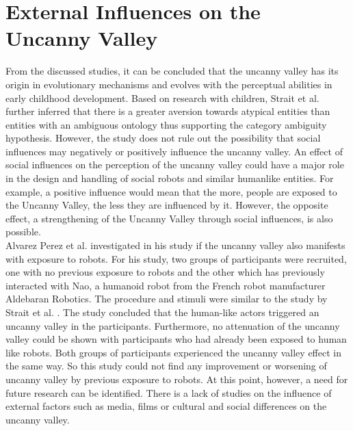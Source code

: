 \section{External Influences on the Uncanny Valley}
From the discussed studies, it can be concluded that the uncanny valley has its origin in evolutionary mechanisms and evolves with the perceptual abilities in early childhood development. Based on research with children, Strait et al. \cite{childrens_responding} further inferred that there is a greater aversion towards atypical entities than entities with an ambiguous ontology thus supporting the category ambiguity hypothesis. However, the study does not rule out the possibility that social influences may negatively or positively influence the uncanny valley. An effect of social influences on the perception of the uncanny valley could have a major role in the design and handling of social robots and similar humanlike entities. For example, a positive influence would mean that the more, people are exposed to the Uncanny Valley, the less they are influenced by it. However, the opposite effect, a strengthening of the Uncanny Valley through social influences, is also possible.\\
Alvarez Perez et al. \cite{prior_exposure_robots} investigated in his study if the uncanny valley also manifests with exposure to robots. For his study, two groups of participants were recruited, one with no previous exposure to robots and the other which has previously interacted with Nao, a humanoid robot from the French robot manufacturer Aldebaran Robotics. The procedure and stimuli were similar to the study by Strait et al. \cite{childrens_responding}. The study concluded that the human-like actors triggered an uncanny valley in the participants. Furthermore, no attenuation of the uncanny valley could be shown with participants who had already been exposed to human like robots. Both groups of participants experienced the uncanny valley effect in the same way. So this study could not find any improvement or worsening of uncanny valley by previous exposure to robots. At this point, however, a need for future research can be identified. There is a lack of studies on the influence of external factors such as media, films or cultural and social differences on the uncanny valley.  




